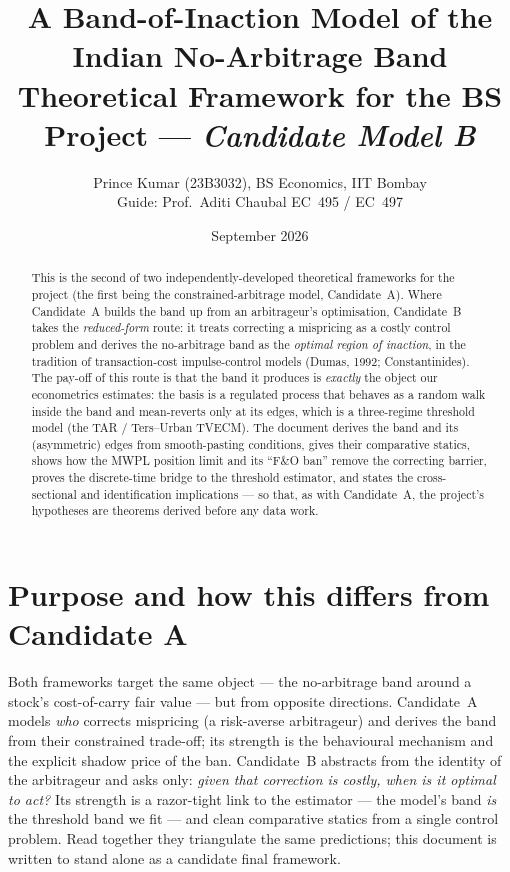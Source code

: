 \documentclass[11pt,a4paper]{article}
\title{\vspace{-1.2cm}\color{accent}\bfseries A Band-of-Inaction Model of the\\ Indian No-Arbitrage Band\\[0.25cm]
\large\mdseries\color{black} Theoretical Framework for the BS Project --- \emph{Candidate Model B}}
\author{Prince Kumar (23B3032), BS Economics, IIT Bombay\\ \small Guide: Prof.\ Aditi Chaubal \quad\textbar\quad EC~495 / EC~497}
\date{September 2026}
\theoremstyle{plain}
\theoremstyle{definition}
\theoremstyle{remark}
\begin{document}
\maketitle
\thispagestyle{empty}

\begin{abstract}
\noindent This is the second of two independently-developed theoretical frameworks for the project (the first being the constrained-arbitrage model, Candidate~A). Where Candidate~A builds the band up from an arbitrageur's optimisation, Candidate~B takes the \emph{reduced-form} route: it treats correcting a mispricing as a costly control problem and derives the no-arbitrage band as the \emph{optimal region of inaction}, in the tradition of transaction-cost impulse-control models (Dumas, 1992; Constantinides). The pay-off of this route is that the band it produces is \emph{exactly} the object our econometrics estimates: the basis is a regulated process that behaves as a random walk inside the band and mean-reverts only at its edges, which is a three-regime threshold model (the TAR / Ters--Urban TVECM). The document derives the band and its (asymmetric) edges from smooth-pasting conditions, gives their comparative statics, shows how the MWPL position limit and its ``F\&O ban'' remove the correcting barrier, proves the discrete-time bridge to the threshold estimator, and states the cross-sectional and identification implications --- so that, as with Candidate~A, the project's hypotheses are theorems derived before any data work.
\end{abstract}

\section{Purpose and how this differs from Candidate A}
Both frameworks target the same object --- the no-arbitrage band around a stock's cost-of-carry fair value --- but from opposite directions. Candidate~A models \emph{who} corrects mispricing (a risk-averse arbitrageur) and derives the band from their constrained trade-off; its strength is the behavioural mechanism and the explicit shadow price of the ban. Candidate~B abstracts from the identity of the arbitrageur and asks only: \emph{given that correction is costly, when is it optimal to act?} Its strength is a razor-tight link to the estimator --- the model's band \emph{is} the threshold band we fit --- and clean comparative statics from a single control problem. Read together they triangulate the same predictions; this document is written to stand alone as a candidate final framework.
\end{document}
